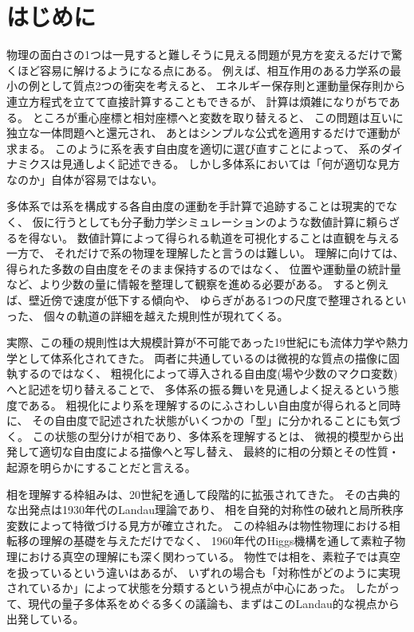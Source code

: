 \documentclass[../master.tex]{subfiles}
\begin{document}
\chapter*{はじめに}
物理の面白さの1つは一見すると難しそうに見える問題が見方を変えるだけで驚くほど容易に解けるようになる点にある。
例えば、相互作用のある力学系の最小の例として質点2つの衝突を考えると、
エネルギー保存則と運動量保存則から連立方程式を立てて直接計算することもできるが、
計算は煩雑になりがちである。
ところが重心座標と相対座標へと変数を取り替えると、
この問題は互いに独立な一体問題へと還元され、
あとはシンプルな公式を適用するだけで運動が求まる。
このように系を表す自由度を適切に選び直すことによって、
系のダイナミクスは見通しよく記述できる。
しかし多体系においては「何が適切な見方なのか」自体が容易ではない。

多体系では系を構成する各自由度の運動を手計算で追跡することは現実的でなく、
仮に行うとしても分子動力学シミュレーションのような数値計算に頼らざるを得ない。
数値計算によって得られる軌道を可視化することは直観を与える一方で、
それだけで系の物理を理解したと言うのは難しい。
理解に向けては、得られた多数の自由度をそのまま保持するのではなく、
位置や運動量の統計量など、より少数の量に情報を整理して観察を進める必要がある。
すると例えば、壁近傍で速度が低下する傾向や、
ゆらぎがある1つの尺度で整理されるといった、
個々の軌道の詳細を越えた規則性が現れてくる。

実際、この種の規則性は大規模計算が不可能であった19世紀にも流体力学や熱力学として体系化されてきた。
両者に共通しているのは微視的な質点の描像に固執するのではなく、
粗視化によって導入される自由度(場や少数のマクロ変数)へと記述を切り替えることで、
多体系の振る舞いを見通しよく捉えるという態度である。
粗視化により系を理解するのにふさわしい自由度が得られると同時に、
その自由度で記述された状態がいくつかの「型」に分かれることにも気づく。
この状態の型分けが相であり、多体系を理解するとは、
微視的模型から出発して適切な自由度による描像へと写し替え、
最終的に相の分類とその性質・起源を明らかにすることだと言える。

\bigskip
相を理解する枠組みは、20世紀を通して段階的に拡張されてきた。
その古典的な出発点は1930年代のLandau理論であり、
相を自発的対称性の破れと局所秩序変数によって特徴づける見方が確立された。
この枠組みは物性物理における相転移の理解の基礎を与えただけでなく、
1960年代のHiggs機構を通して素粒子物理における真空の理解にも深く関わっている。
物性では相を、素粒子では真空を扱っているという違いはあるが、
いずれの場合も「対称性がどのように実現されているか」によって状態を分類するという視点が中心にあった。
したがって、現代の量子多体系をめぐる多くの議論も、まずはこのLandau的な視点から出発している。
\end{document}
